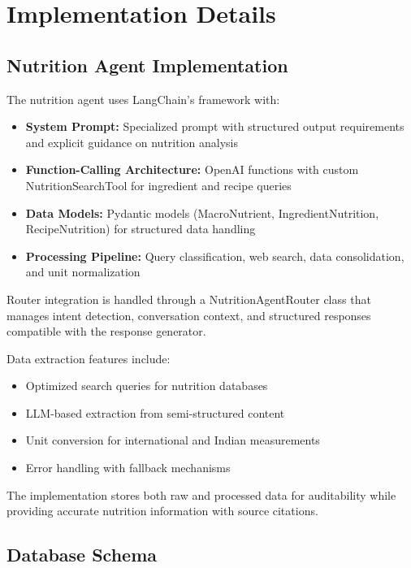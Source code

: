 \documentclass{ecai}
\begin{document}
\section{Implementation Details}

\subsection{Nutrition Agent Implementation}

The nutrition agent uses LangChain's framework with:

\begin{itemize}[noitemsep,topsep=0pt]
    \item \textbf{System Prompt:} Specialized prompt with structured output requirements and explicit guidance on nutrition analysis

    \item \textbf{Function-Calling Architecture:} OpenAI functions with custom NutritionSearchTool for ingredient and recipe queries

    \item \textbf{Data Models:} Pydantic models (MacroNutrient, IngredientNutrition, RecipeNutrition) for structured data handling

    \item \textbf{Processing Pipeline:} Query classification, web search, data consolidation, and unit normalization
\end{itemize}

Router integration is handled through a NutritionAgentRouter class that manages intent detection, conversation context, and structured responses compatible with the response generator.

Data extraction features include:

\begin{itemize}[noitemsep,topsep=0pt]
    \item Optimized search queries for nutrition databases
    \item LLM-based extraction from semi-structured content
    \item Unit conversion for international and Indian measurements
    \item Error handling with fallback mechanisms
\end{itemize}

The implementation stores both raw and processed data for auditability while providing accurate nutrition information with source citations.

\subsection{Database Schema}
\end{document}
